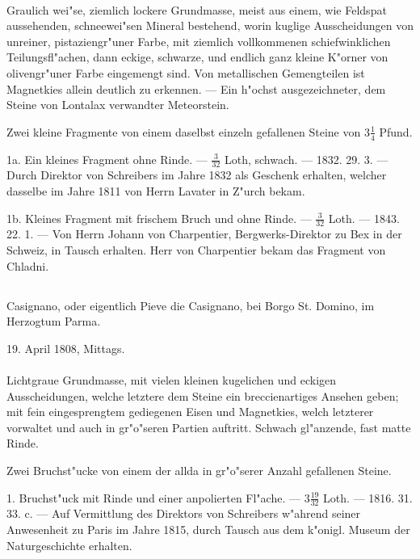 \documentclass[a4paper, 11pt, oneside, polutonikogreek, german]{article}
\begin{document}
\paragraph{}
Graulich wei"se, ziemlich lockere Grundmasse, meist aus einem, wie Feldspat aussehenden, schneewei"sen Mineral bestehend‚ worin kuglige Ausscheidungen von unreiner, pistaziengr"uner Farbe, mit ziemlich vollkommenen schiefwinklichen Teilungsfl"achen, dann eckige, schwarze, und endlich ganz kleine K"orner von olivengr"uner Farbe eingemengt sind. Von metallischen Gemengteilen ist Magnetkies allein deutlich zu erkennen. --- Ein h"ochst ausgezeichneter, dem Steine von Lontalax verwandter Meteorstein.

Zwei kleine Fragmente von einem daselbst einzeln gefallenen Steine von $\mathfrak{3\frac{1}{4}}$ Pfund.

1a. Ein kleines Fragment ohne Rinde. --- $\mathfrak{\frac{3}{32}}$ Loth, schwach. --- 1832. 29. 3. --- Durch Direktor von Schreibers im Jahre 1832 als Geschenk erhalten, welcher dasselbe im Jahre 1811 von Herrn Lavater in Z"urch bekam.

1b. Kleines Fragment mit frischem Bruch und ohne Rinde. --- $\mathfrak{\frac{3}{32}}$ Loth. --- 1843. 22. 1. --- Von Herrn Johann von Charpentier, Bergwerks-Direktor zu Bex in der Schweiz, in Tausch erhalten. Herr von Charpentier bekam das Fragment von Chladni.
\subsection{}
\begin{center}

Casignano, oder eigentlich Pieve die Casignano, bei Borgo St. Domino, im Herzogtum Parma.

19. April 1808, Mittags.
\end{center}
\paragraph{}
Lichtgraue Grundmasse, mit vielen kleinen kugelichen und eckigen Ausscheidungen, welche letztere dem Steine ein breccienartiges Ansehen geben; mit fein eingesprengtem gediegenen Eisen und Magnetkies, welch letzterer vorwaltet und auch in gr"o"seren Partien auftritt. Schwach gl"anzende, fast matte Rinde.

Zwei Bruchst"ucke von einem der allda in gr"o"serer Anzahl gefallenen Steine.

1. Bruchst"uck mit Rinde und einer anpolierten Fl"ache. --- $\mathfrak{3\frac{19}{32}}$ Loth. --- 1816. 31. 33. c. --- Auf Vermittlung des Direktors von Schreibers w"ahrend seiner Anwesenheit zu Paris im Jahre 1815, durch Tausch aus dem k"onigl. Museum der Naturgeschichte erhalten.
\end{document}
